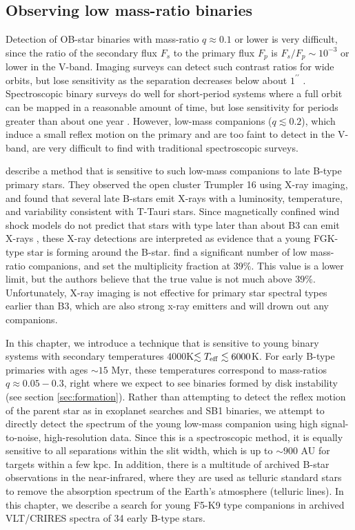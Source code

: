 \documentclass[11pt]{report}     %
\begin{document}
\subsection{Observing low mass-ratio binaries}
\label{sec:otherobs}
Detection of OB-star binaries with mass-ratio $q \approx 0.1$ or lower is very
difficult, since the ratio of the secondary flux $F_s$ to the primary
flux $F_p$ is $F_s/F_p \sim 10^{-3}$ or lower in the V-band. Imaging surveys
can detect such contrast ratios for wide orbits, but lose sensitivity
as the separation decreases below about $1^{\prime\prime}$
\citep[e.g.][]{Maiz2010}. Spectroscopic binary surveys do well for
short-period systems where a full orbit can be mapped in a reasonable
amount of time, but lose sensitivity for periods greater than about one year
\citep[e.g.][]{Sana2009, Evans2010}. However, low-mass companions ($q \lesssim
0.2$), which induce a small reflex motion on the primary and are too
faint to detect in the V-band, are very difficult to find with
traditional spectroscopic surveys.

\cite{Evans2011} describe a method that is sensitive to such low-mass
companions to late B-type primary stars. They observed the open cluster Trumpler 16 using
X-ray imaging, and found that several late B-stars emit X-rays with a
luminosity, temperature, and variability consistent with T-Tauri stars. Since magnetically confined wind shock models do
not predict that stars with type later than about B3 can emit X-rays
\citep{Gagne1997}, these X-ray detections
are interpreted as evidence that a young FGK-type star is forming
around the B-star. \cite{Evans2011} find a significant number of low mass-ratio
companions, and set the multiplicity fraction at $39\%$. This value is
a lower limit, but the authors believe that the true value is not much
above $39\%$.  Unfortunately, X-ray imaging is not effective for
primary star spectral types earlier than B3, which are also strong
x-ray emitters \citep{Gagne1997} and will drown out any companions.

In this chapter, we introduce a technique that is sensitive to young binary
systems with secondary temperatures $4000 $K$ \lesssim T_{\rm eff} \lesssim
6000 $K. For early B-type primaries with ages $\sim 15$ Myr, these
temperatures correspond to mass-ratios $q \approx 0.05-0.3$, right
where we expect to see binaries formed by disk instability (see
section \ref{sec:formation}). Rather
than attempting to detect the reflex motion of the parent
star as in exoplanet searches and SB1 binaries, we attempt to directly
detect the spectrum of the young low-mass companion using high
signal-to-noise, high-resolution data. Since this is a spectroscopic method, it is equally
sensitive to all separations within the slit width, which is up to $\sim 900$ AU for targets within a few kpc. In addition, there
is a multitude of archived B-star observations in the near-infrared,
where they are used as telluric standard stars to
remove the absorption spectrum of the Earth's atmosphere (telluric
lines). In this chapter, we describe a search for young F5-K9 type companions in
archived VLT/CRIRES spectra of 34 early B-type stars.
\end{document}
